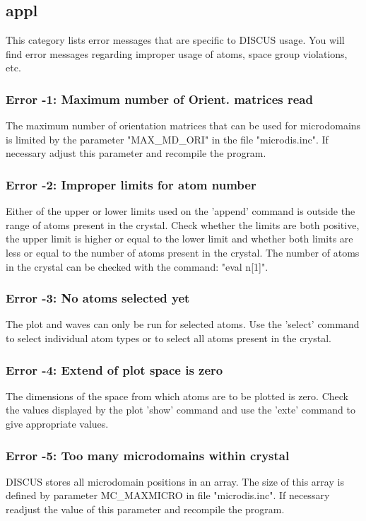 \subsection*{appl}
\par
This category lists error messages that are specific to DISCUS usage. 
You will find error messages regarding improper usage of atoms, 
space group violations, etc. 
\par
\subsubsection{Error -1: Maximum number of Orient. matrices read}
\par
The maximum number of orientation matrices that can be used for 
microdomains is limited by the parameter "MAX\_MD\_ORI" in the file 
"microdis.inc". If necessary adjust this parameter and recompile the 
program. 
\subsubsection{Error -2: Improper limits for atom number}
\par
Either of the upper or lower limits used on the 'append' command is 
outside the range of atoms present in the crystal. Check whether 
the limits are both positive, the upper limit is higher or equal to 
the lower limit and whether both limits are less or equal to the 
number of atoms present in the crystal. The number of atoms in the 
crystal can be checked with the command: "eval n[1]". 
\subsubsection{Error -3: No atoms selected yet}
\par
The plot and waves can only be run for selected atoms. Use the 'select' 
command to select individual atom types or to select all atoms present 
in the crystal. 
\subsubsection{Error -4: Extend of plot space is zero}
\par
The dimensions of the space from which atoms are to be plotted is zero. 
Check the values displayed by the plot 'show' command and use the 
'exte' command to give appropriate values. 
\subsubsection{Error -5: Too many microdomains within crystal}
\par
DISCUS stores all microdomain positions in an array. The size of 
this array is defined by parameter MC\_MAXMICRO in file "microdis.inc". 
If necessary readjust the value of this parameter and recompile the 
program. 
